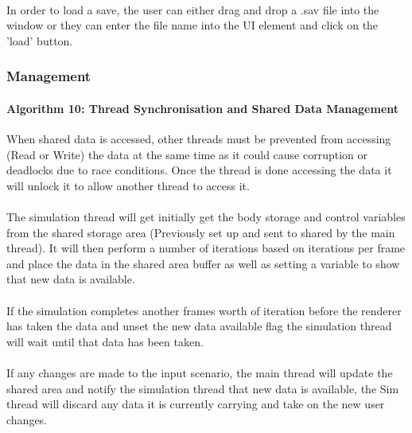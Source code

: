 \paragraph{}
In order to load a save, the user can either drag and drop a .sav file into the window or they can enter the file name into the UI element and click on the 'load' button.

\subsubsection{Management}
\paragraph{Algorithm 10: Thread Synchronisation and Shared Data Management}
When shared data is accessed, other threads must be prevented from accessing (Read or Write) the data at the same time as it could cause corruption or deadlocks due to race conditions. Once the thread is done accessing the data it will unlock it to allow another thread to access it.

\paragraph{}
The simulation thread will get initially get the body storage and control variables from the shared storage area (Previously set up and sent to shared by the main thread). It will then perform a number of iterations based on iterations per frame and place the data in the shared area buffer as well as setting a variable to show that new data is available.

\paragraph{}
If the simulation completes another frames worth of iteration before the renderer has taken the data and unset the new data available flag the simulation thread will wait until that data has been taken.

\paragraph{}
If any changes are made to the input scenario, the main thread will update the shared area and notify the simulation thread that new data is available, the Sim thread will discard any data it is currently carrying and take on the new user changes.